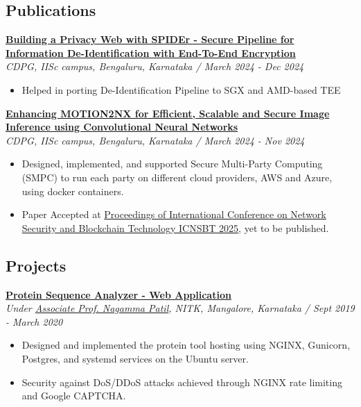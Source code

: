 \documentclass[a4paper,11pt]{article}
\newcommand{\isep}{-2 pt}
\begin{document}
\subsection*{Publications}
\textbf{\href{https://ieeexplore.ieee.org/abstract/document/10918872/}{Building a Privacy Web with SPIDEr - Secure Pipeline for Information De-Identification with End-To-End Encryption}} \\
\textit{CDPG, IISc campus, Bengaluru, Karnataka / March 2024 - Dec 2024}
\begin{itemize}\itemsep \isep  
\item Helped in porting De-Identification Pipeline to SGX and AMD-based TEE
\end{itemize}
\textbf{\href{https://arxiv.org/abs/2408.16387}{Enhancing MOTION2NX for Efficient, Scalable and Secure Image Inference using Convolutional Neural Networks}} \\
\textit{CDPG, IISc campus, Bengaluru, Karnataka / March 2024 - Nov 2024}
\begin{itemize}\itemsep \isep  
\item Designed, implemented, and supported Secure Multi-Party Computing (SMPC) to run each party on
different cloud providers, AWS and Azure, using docker containers.
\item Paper Accepted at \href{https://link.springer.com/book/9789819663477}{Proceedings of International Conference on Network Security and Blockchain Technology ICNSBT 2025}, yet to be published.
\end{itemize}
\subsection*{Projects}
\textbf{\href{https://nitkit-vgst727-nppsa.nitk.ac.in/}{Protein Sequence Analyzer - Web Application}}  \\
  \textit{Under  \href{https://infotech.nitk.ac.in/faculty/nagamma-patil}{Associate Prof. Nagamma Patil}, NITK, Mangalore, Karnataka / Sept 2019 - March 2020}  
	\begin{itemize}\itemsep \isep                  
    \item Designed and implemented the protein tool hosting using NGINX, Gunicorn, Postgres, and systemd services on the Ubuntu server.
	\item Security against DoS/DDoS attacks achieved through NGINX rate limiting and Google CAPTCHA.
	\end{itemize}
\end{document}
